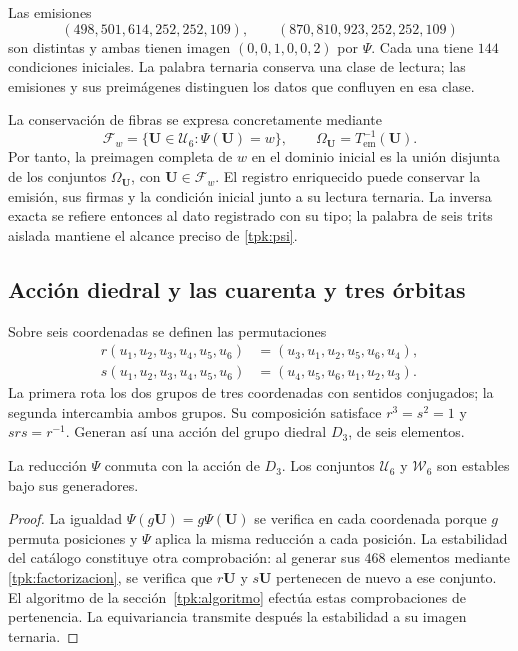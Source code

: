 \begin{ejemplo}
\label{tpk:colision}
Las emisiones
\[
 (498,501,614,252,252,109),\qquad
 (870,810,923,252,252,109)
\]
son distintas y ambas tienen imagen \((0,0,1,0,0,2)\) por \(\Psi\).
Cada una tiene \(144\) condiciones iniciales. La palabra ternaria conserva
una clase de lectura; las emisiones y sus preimágenes distinguen los datos
que confluyen en esa clase.
\end{ejemplo}

La conservación de fibras se expresa concretamente mediante
\[
 \mathcal F_w=\{\mathbf U\in\mathcal U_6:\Psi(\mathbf U)=w\},
 \qquad
 \Omega_{\mathbf U}=T_{\mathrm{em}}^{-1}(\mathbf U).
\]
Por tanto, la preimagen completa de \(w\) en el dominio inicial es la
unión disjunta de los conjuntos \(\Omega_{\mathbf U}\), con
\(\mathbf U\in\mathcal F_w\). El registro enriquecido puede conservar la
emisión, sus firmas y la condición inicial junto a su lectura ternaria.
La inversa exacta se refiere entonces al dato registrado con su tipo;
la palabra de seis trits aislada mantiene el alcance preciso de
\eqref{tpk:psi}.

\subsection{Acción diedral y las cuarenta y tres órbitas}
\label{tpk:orbitas}

Sobre seis coordenadas se definen las permutaciones
\begin{align}
 r(u_1,u_2,u_3,u_4,u_5,u_6)
   &=(u_3,u_1,u_2,u_5,u_6,u_4),\\
 s(u_1,u_2,u_3,u_4,u_5,u_6)
   &=(u_4,u_5,u_6,u_1,u_2,u_3).
 \label{tpk:generadores-diedrales}
\end{align}
La primera rota los dos grupos de tres coordenadas con sentidos conjugados;
la segunda intercambia ambos grupos. Su composición satisface
\(r^3=s^2=1\) y \(srs=r^{-1}\). Generan así una acción del grupo diedral
\(D_3\), de seis elementos.

\begin{proposicion}
\label{tpk:equivarianza}
La reducción \(\Psi\) conmuta con la acción de \(D_3\). Los conjuntos
\(\mathcal U_6\) y \(\mathcal W_6\) son estables bajo sus generadores.
\end{proposicion}
\begin{proof}
La igualdad \(\Psi(g\mathbf U)=g\Psi(\mathbf U)\) se verifica en cada
coordenada porque \(g\) permuta posiciones y \(\Psi\) aplica la misma
reducción a cada posición. La estabilidad del catálogo constituye otra
comprobación: al generar sus \(468\) elementos mediante
\eqref{tpk:factorizacion}, se verifica que \(r\mathbf U\) y
\(s\mathbf U\) pertenecen de nuevo a ese conjunto. El algoritmo de la
sección~\ref{tpk:algoritmo} efectúa estas comprobaciones de pertenencia.
La equivariancia transmite después la estabilidad a su imagen ternaria.
\end{proof}


